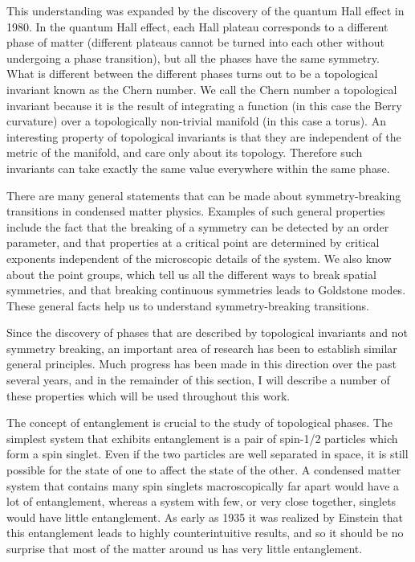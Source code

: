 This understanding was expanded by the discovery of the quantum Hall effect in 1980.\cite{klitzing} In the quantum Hall effect, each Hall plateau corresponds to a different phase of matter (different plateaus cannot be turned into each other without undergoing a phase transition), but all the phases have the same symmetry. What is different between the different phases turns out to be a topological invariant known as the Chern number. We call the Chern number a topological invariant because it is the result of integrating a function (in this case the Berry curvature) over a topologically non-trivial manifold (in this case a torus). An interesting property of topological invariants is that they are independent of the metric of the manifold, and care only about its topology. Therefore such invariants can take exactly the same value everywhere within the same phase. 

There are many general statements that can be made about symmetry-breaking transitions in condensed matter physics. 
Examples of such general properties include the fact that the breaking of a symmetry can be detected by an order parameter, and that properties at a critical point are determined by  critical exponents independent of the microscopic details of the system. We also know about the point groups, which tell us all the different ways to break spatial symmetries, and that breaking continuous symmetries leads to Goldstone modes. These general facts help us to understand symmetry-breaking transitions.

Since the discovery of phases that are described by topological invariants and not symmetry breaking, an important area of research has been to establish similar general principles. Much progress has been made in this direction over the past several years, and in the remainder of this section, I will describe a number of these properties which will be used throughout this work.

The concept of entanglement is crucial to the study of topological phases. The simplest system that exhibits entanglement is a pair of spin-1/2 particles which form a spin singlet. Even if the two particles are well separated in space, it is still possible for the state of one to affect the state of the other. A condensed matter system that contains many spin singlets macroscopically far apart would have a lot of entanglement, whereas a system with few, or very close together, singlets would have little entanglement. As early as 1935 it was realized by Einstein\cite{Einstein} that this entanglement leads to highly counterintuitive results, and so it should be no surprise that most of the matter around us has very little entanglement.


